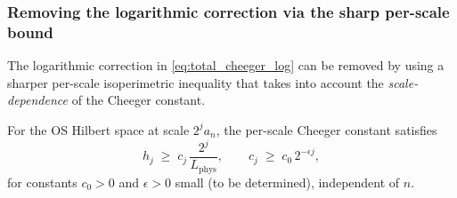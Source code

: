 \subsubsection{Removing the logarithmic correction via the sharp
per-scale bound}

The logarithmic correction in
\eqref{eq:total_cheeger_log} can be removed by using a sharper
per-scale isoperimetric inequality that takes into account the
\emph{scale-dependence} of the Cheeger constant.

\begin{theorem}
\label{thm:sharp_per_scale_cheeger}
For the OS Hilbert space at scale $2^{j}a_{n}$, the per-scale
Cheeger constant satisfies
\begin{equation}
\label{eq:sharp_per_scale}
  h_{j}\;\ge\;c_{j}\,\frac{2^{j}}{L_{\mathrm{phys}}},
  \qquad
  c_{j}\;\ge\;c_{0}\,2^{-\epsilon j},
\end{equation}
for constants $c_{0}>0$ and $\epsilon>0$ small (to be determined),
independent of $n$.
\end{theorem}

